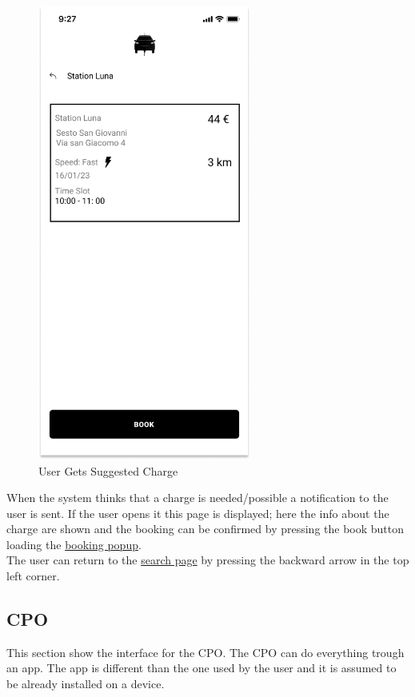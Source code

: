 \begin{figure}[H]
    \centering
    \includegraphics[keepaspectratio, height=15cm]{Mockup/UserAppInterface/Suggested Charge.png}
    \caption{User Gets Suggested Charge}
    \label{fig:Suggested}
\end{figure}
When the system thinks that a charge is needed/possible a notification to the user is sent. If the user opens it this page is displayed; here the info about the charge are shown and the booking can be confirmed by pressing the book button loading the \hyperref[pop:Booking]{booking popup}.\\
The user can return to the \hyperref[fig:Search]{search page} by pressing the backward arrow in the top left corner.
\subsection{CPO}
This section show the interface for the \ac{CPO}. The \ac{CPO} can do everything trough an app. The app is different than the one used by the user and it is assumed to be already installed on a device.
